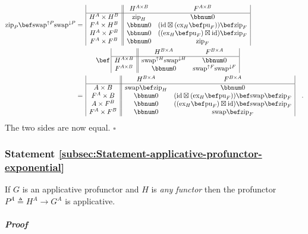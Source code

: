 \begin{align*}
\text{zip}_{P}\bef\text{swap}^{\uparrow P}\text{swap}^{\downarrow P} & =\,\begin{array}{|c||cc|}
 & H^{A\times B} & F^{A\times B}\\
\hline H^{A}\times H^{B} & \text{zip}_{H} & \bbnum 0\\
F^{A}\times H^{B} & \bbnum 0 & (\text{id}\boxtimes(\text{ex}_{H}\bef\text{pu}_{F}))\bef\text{zip}_{F}\\
H^{A}\times F^{B} & \bbnum 0 & ((\text{ex}_{H}\bef\text{pu}_{F})\boxtimes\text{id})\bef\text{zip}_{F}\\
F^{A}\times F^{B} & \bbnum 0 & \text{zip}_{F}
\end{array}\\
 & \quad\quad\quad\bef\,\begin{array}{|c||cc|}
 & H^{B\times A} & F^{B\times A}\\
\hline H^{A\times B} & \text{swap}^{\uparrow H}\text{swap}^{\downarrow H} & \bbnum 0\\
F^{A\times B} & \bbnum 0 & \text{swap}^{\uparrow F}\text{swap}^{\downarrow F}
\end{array}\\
 & =\,\begin{array}{|c||cc|}
 & H^{B\times A} & F^{B\times A}\\
\hline A\times B & \text{swap}\bef\text{zip}_{H} & \bbnum 0\\
F^{A}\times B & \bbnum 0 & (\text{id}\boxtimes(\text{ex}_{H}\bef\text{pu}_{F}))\bef\text{swap}\bef\text{zip}_{F}\\
A\times F^{B} & \bbnum 0 & ((\text{ex}_{H}\bef\text{pu}_{F})\boxtimes\text{id})\bef\text{swap}\bef\text{zip}_{F}\\
F^{A}\times F^{B} & \bbnum 0 & \text{swap}\bef\text{zip}_{F}
\end{array}\quad.
\end{align*}
The two sides are now equal. $\square$

\subsubsection{Statement \label{subsec:Statement-applicative-profunctor-exponential}\ref{subsec:Statement-applicative-profunctor-exponential}}

If $G$ is an applicative profunctor and $H$ is \emph{any functor}
then the profunctor $P^{A}\triangleq H^{A}\rightarrow G^{A}$ is applicative.

\subparagraph{Proof}

